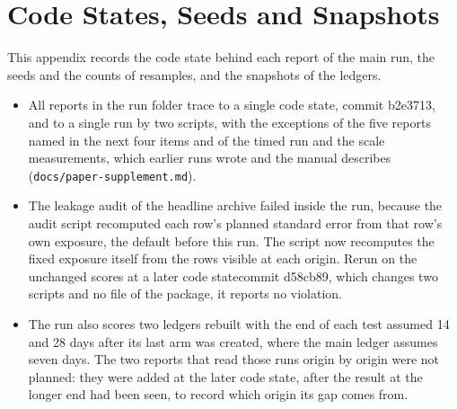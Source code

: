 \section{Code States, Seeds and Snapshots}
\label{app:walltime}
This appendix records the code state behind each report of the main run, the seeds and the counts of resamples, and the snapshots of the ledgers.
\begin{itemize}
\item All reports in the run folder trace to a single code state\iftmlr\else , commit b2e3713\fi, and to a single run by two scripts, with the exceptions of the five reports named in the next four items and of the timed run and the scale measurements, which earlier runs wrote and the manual describes (\texttt{docs/paper-supplement.md}).
\item The leakage audit of the headline archive failed inside the run, because the audit script recomputed each row's planned standard error from that row's own exposure, the default before this run. The script now recomputes the fixed exposure itself from the rows visible at each origin. Rerun on the unchanged scores at \iftmlr a later code state\else commit d58cb89\fi, which changes two scripts and no file of the package, it reports no violation.
\item The run also scores two ledgers rebuilt with the end of each test assumed 14 and 28 days after its last arm was created, where the main ledger assumes seven days. The two reports that read those runs origin by origin were not planned: they were added at the later code state, after the result at the longer end had been seen, to record which origin its gap comes from.

\end{itemize}
